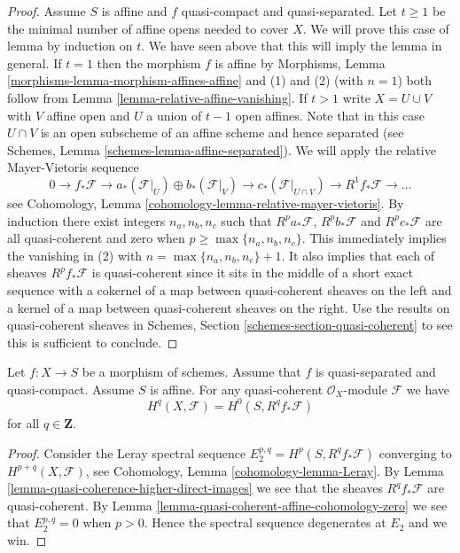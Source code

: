 \begin{proof}
\medskip\noindent
Assume $S$ is affine and $f$ quasi-compact and quasi-separated.
Let $t \geq 1$ be the minimal number of affine opens needed to cover $X$.
We will prove this case of lemma by induction on $t$. We have seen above
that this will imply the lemma in general.
If $t = 1$ then the morphism $f$ is affine by
Morphisms, Lemma \ref{morphisms-lemma-morphism-affines-affine}
and (1) and (2) (with $n = 1$)
both follow from Lemma \ref{lemma-relative-affine-vanishing}.
If $t > 1$ write $X = U \cup V$ with $V$ affine open and
$U$ a union of $t - 1$ open affines.
Note that in this case $U \cap V$ is an open subscheme of an affine
scheme and hence separated (see
Schemes, Lemma \ref{schemes-lemma-affine-separated}).
We will apply the relative Mayer-Vietoris sequence
$$
0 \to
f_*\mathcal{F} \to
a_*(\mathcal{F}|_U) \oplus b_*(\mathcal{F}|_V) \to
c_*(\mathcal{F}|_{U \cap V}) \to
R^1f_*\mathcal{F} \to \ldots
$$
see Cohomology, Lemma \ref{cohomology-lemma-relative-mayer-vietoris}.
By induction there exist integers $n_a, n_b, n_c$ such that
$R^pa_*\mathcal{F}$, $R^pb_*\mathcal{F}$ and $R^pc_*\mathcal{F}$
are all quasi-coherent and zero when $p \geq \max\{n_a, n_b, n_c\}$.
This immediately implies the vanishing in (2) with
$n = \max\{n_a, n_b, n_c\} + 1$. It also implies that each of sheaves
$R^pf_*\mathcal{F}$ is quasi-coherent since it sits in the middle of a short
exact sequence with a cokernel of a map between quasi-coherent sheaves
on the left and a kernel of a map between quasi-coherent sheaves on the right.
Use the results on quasi-coherent sheaves in
Schemes, Section \ref{schemes-section-quasi-coherent} to see
this is sufficient to conclude.
\end{proof}

\begin{lemma}
\label{lemma-quasi-coherence-higher-direct-images-application}
Let $f : X \to S$ be a morphism of schemes.
Assume that $f$ is quasi-separated and quasi-compact.
Assume $S$ is affine.
For any quasi-coherent $\mathcal{O}_X$-module $\mathcal{F}$
we have
$$
H^q(X, \mathcal{F}) = H^0(S, R^qf_*\mathcal{F})
$$
for all $q \in \mathbf{Z}$.
\end{lemma}

\begin{proof}
Consider the Leray spectral sequence $E_2^{p, q} = H^p(S, R^qf_*\mathcal{F})$
converging to $H^{p + q}(X, \mathcal{F})$, see
Cohomology, Lemma \ref{cohomology-lemma-Leray}.
By Lemma \ref{lemma-quasi-coherence-higher-direct-images}
we see that the sheaves $R^qf_*\mathcal{F}$ are quasi-coherent.
By Lemma \ref{lemma-quasi-coherent-affine-cohomology-zero}
we see that $E_2^{p, q} = 0$ when $p > 0$.
Hence the spectral sequence degenerates at $E_2$ and we win.
\end{proof}












